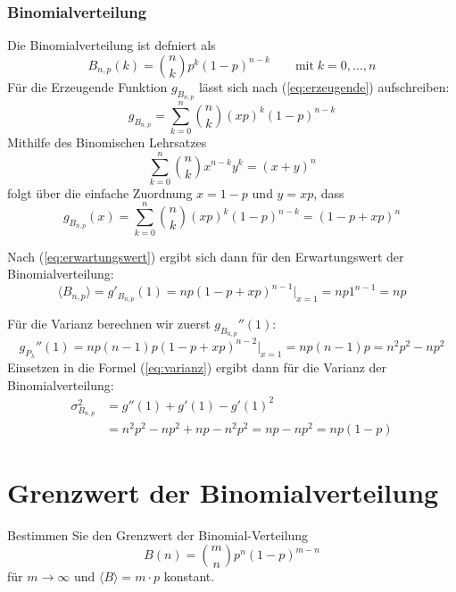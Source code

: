 \documentclass[a4paper]{article}
\begin{document}
\subsubsection{Binomialverteilung}
Die Binomialverteilung ist defniert als
\begin{equation}
    B_{n,p}(k) = \binom{n}{k} p^k (1-p)^{n-k}   \qquad \text{mit}\; k=0,\ldots,n
\end{equation}
Für die Erzeugende Funktion $g_{B_{n,p}}$ lässt sich nach (\ref{eq:erzeugende}) aufschreiben:
\begin{equation}
    g_{B_{n,p}} = \sum_{k=0}^n \binom{n}{k} (xp)^k (1-p)^{n-k}
\end{equation}
Mithilfe des Binomischen Lehrsatzes
\begin{equation}
    \sum_{k=0}^n \binom{n}{k} x^{n-k} y^k  = (x+y)^n
\end{equation}
folgt über die einfache Zuordnung $x=1-p$ und $y=xp$, dass
\begin{equation}
    g_{B_{n,p}}(x) = \sum_{k=0}^n \binom{n}{k} (xp)^k (1-p)^{n-k} = (1-p+xp)^n
\end{equation}

Nach (\ref{eq:erwartungswert}) ergibt sich dann für den Erwartungswert der Binomialverteilung:
\begin{equation}
    \langle B_{n,p} \rangle = g'_{B_{n,p}}(1)
    = np(1-p+xp)^{n-1} \Big|_{x=1}
    = np 1^{n-1} = np
\end{equation}

Für die Varianz berechnen wir zuerst $g_{B_{n,p}}''(1)$:
\begin{equation}
    g_{P_\lambda}''(1) = np(n-1)p(1-p+xp)^{n-2} \Big|_{x=1}
                       = np(n-1)p = n^2 p^2 - n p^2
\end{equation}
Einsetzen in die Formel (\ref{eq:varianz}) ergibt dann
für die Varianz der Binomialverteilung:
\begin{align*}
    \sigma_{B_{n,p}}^2 &= g''(1) + g'(1) - g'(1)^2 \\
                       &= n^2 p^2 - n p^2 + np - n^2 p^2
                       = np-np^2 = np(1-p)
\end{align*}


\section{Grenzwert der Binomialverteilung}
Bestimmen Sie den Grenzwert der Binomial-Verteilung
\begin{equation}
    B(n) = \binom{m}{n} p^n (1-p)^{m-n} \label{eq:binom}
\end{equation}
für $m\to\infty$ und $\langle B \rangle = m \cdot p$ konstant.
\end{document}
